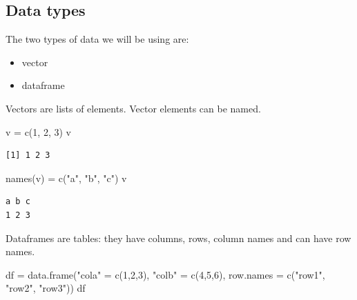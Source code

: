 \documentclass[
  24px,
  letterpaper,
  DIV=11,
  numbers=noendperiod]{scrartcl}
\newenvironment{Shaded}{\begin{snugshade}}{\end{snugshade}}
\newcommand{\AttributeTok}[1]{\textcolor[rgb]{0.40,0.45,0.13}{#1}}
\newcommand{\DecValTok}[1]{\textcolor[rgb]{0.68,0.00,0.00}{#1}}
\newcommand{\FunctionTok}[1]{\textcolor[rgb]{0.28,0.35,0.67}{#1}}
\newcommand{\NormalTok}[1]{\textcolor[rgb]{0.00,0.23,0.31}{#1}}
\newcommand{\OtherTok}[1]{\textcolor[rgb]{0.00,0.23,0.31}{#1}}
\newcommand{\StringTok}[1]{\textcolor[rgb]{0.13,0.47,0.30}{#1}}
\begin{document}
\hypertarget{data-types}{%
\subsection{Data types}\label{data-types}}

The two types of data we will be using are:

\begin{itemize}
\item
  vector
\item
  dataframe
\end{itemize}

Vectors are lists of elements. Vector elements can be named.

\begin{Shaded}
\begin{Highlighting}[]
\NormalTok{v }\OtherTok{=} \FunctionTok{c}\NormalTok{(}\DecValTok{1}\NormalTok{, }\DecValTok{2}\NormalTok{, }\DecValTok{3}\NormalTok{)}
\NormalTok{v}
\end{Highlighting}
\end{Shaded}

\begin{verbatim}
[1] 1 2 3
\end{verbatim}

\begin{Shaded}
\begin{Highlighting}[]
\FunctionTok{names}\NormalTok{(v) }\OtherTok{=} \FunctionTok{c}\NormalTok{(}\StringTok{"a"}\NormalTok{, }\StringTok{"b"}\NormalTok{, }\StringTok{"c"}\NormalTok{)}
\NormalTok{v}
\end{Highlighting}
\end{Shaded}

\begin{verbatim}
a b c 
1 2 3 
\end{verbatim}

Dataframes are tables: they have columns, rows, column names and can
have row names.

\begin{Shaded}
\begin{Highlighting}[]
\NormalTok{df }\OtherTok{=} \FunctionTok{data.frame}\NormalTok{(}\StringTok{"cola"} \OtherTok{=} \FunctionTok{c}\NormalTok{(}\DecValTok{1}\NormalTok{,}\DecValTok{2}\NormalTok{,}\DecValTok{3}\NormalTok{), }\StringTok{"colb"} \OtherTok{=} \FunctionTok{c}\NormalTok{(}\DecValTok{4}\NormalTok{,}\DecValTok{5}\NormalTok{,}\DecValTok{6}\NormalTok{), }\AttributeTok{row.names =} \FunctionTok{c}\NormalTok{(}\StringTok{"row1"}\NormalTok{, }\StringTok{"row2"}\NormalTok{, }\StringTok{"row3"}\NormalTok{))}
\NormalTok{df}
\end{Highlighting}
\end{Shaded}
\end{document}
